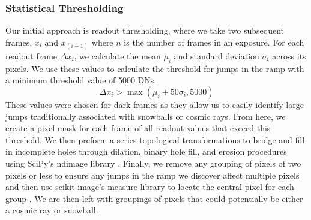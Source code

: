 \subsubsection{Statistical Thresholding}
Our initial approach is readout thresholding, where we take two subsequent frames, $x_i$ and $x_{(i-1)}$ where $n$ is the number of frames in an exposure. 
For each readout frame $\Delta x_i$, we calculate the mean $\mu_i$ and standard deviation $\sigma_i$ across its pixels. 
We use these values to calculate the threshold for jumps in the ramp with a minimum threshold value of 5000 DNs.
\begin{equation}
    \Delta x_i > \max(\mu_i + 50 \sigma_i, 5000)
\end{equation}
These values were chosen for dark frames as they allow us to easily identify large jumps traditionally associated with snowballs or cosmic rays. 
From here, we create a pixel mask for each frame of all readout values that exceed this threshold. 
We then preform a series topological transformations to bridge and fill in incomplete holes through dilation, binary hole fill, and erosion procedures using SciPy's ndimage library \cite{2020SciPy-NMeth}.
Finally, we remove any grouping of pixels of two pixels or less to ensure any jumps in the ramp we discover affect multiple pixels and then use scikit-image's measure library to locate the central pixel for each group \cite{scikit-image}.
We are then left  with groupings of pixels that could potentially be either a cosmic ray or snowball.


